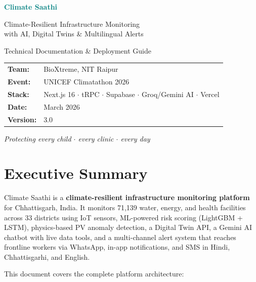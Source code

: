 \documentclass[12pt,a4paper]{report}
\begin{document}
\begin{titlepage}
\centering
\vspace*{3cm}

{\Huge\bfseries\textcolor{teal}{Climate Saathi}\par}
\vspace{0.8cm}
{\Large\textcolor{forest}{Climate-Resilient Infrastructure Monitoring\\with AI, Digital Twins \& Multilingual Alerts}\par}
\vspace{1.5cm}
{\large Technical Documentation \& Deployment Guide\par}

\vspace{3cm}

\begin{tabular}{ll}
\textbf{Team:}        & BioXtreme, NIT Raipur \\
\textbf{Event:}       & UNICEF Climatathon 2026 \\
\textbf{Stack:}       & Next.js 16 $\cdot$ tRPC $\cdot$ Supabase $\cdot$ Groq/Gemini AI $\cdot$ Vercel \\
\textbf{Date:}        & March 2026 \\
\textbf{Version:}     & 3.0 \\
\end{tabular}

\vfill
\textit{Protecting every child $\cdot$ every clinic $\cdot$ every day}
\end{titlepage}

\tableofcontents
\newpage

\chapter{Executive Summary}

Climate Saathi is a \textbf{climate-resilient infrastructure monitoring platform} for Chhattisgarh, India. It monitors 71,139 water, energy, and health facilities across 33 districts using IoT sensors, ML-powered risk scoring (LightGBM + LSTM), physics-based PV anomaly detection, a Digital Twin API, a Gemini AI chatbot with live data tools, and a multi-channel alert system that reaches frontline workers via WhatsApp, in-app notifications, and SMS in Hindi, Chhattisgarhi, and English.

This document covers the complete platform architecture:
\end{document}
